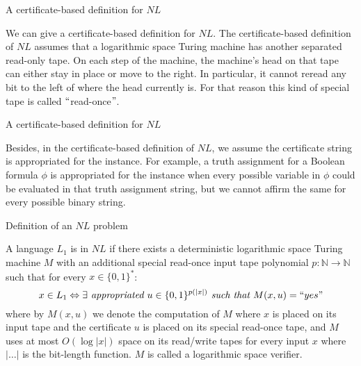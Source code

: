 \documentclass[11pt]{beamer}
\begin{document}
\begin{frame}{A certificate-based definition for $NL$}

We can give a certificate-based definition for $NL$. The certificate-based definition of $NL$ assumes that a logarithmic space Turing machine has another separated read-only tape. On each step of the machine, the machine's head on that tape can either stay in place or move to the right. In particular, it cannot reread any bit to the left of where the head currently is. For that reason this kind of special tape is called $``$read-once$"$.

\end{frame}

\begin{frame}{A certificate-based definition for $NL$}

Besides, in the certificate-based definition of $NL$, we assume the certificate string is appropriated for the instance. For example, a truth assignment for a Boolean formula $\phi$ is appropriated for the instance when every possible variable in $\phi$ could be evaluated in that truth assignment string, but we cannot affirm the same for every possible binary string.

\end{frame}

\begin{frame}{Definition of an $NL$ problem}

\begin{definition}
A language $L_{1}$ is in $NL$ if there exists a deterministic logarithmic space Turing machine $M$ with an additional special read-once input tape polynomial $p: \mathbb{N} \rightarrow \mathbb{N}$ such that for every $x \in \{0, 1\}^{*}$:
\[x \in L_{1} \Leftrightarrow \exists \textit{ appropriated } u \in \{0, 1\}^{p(|x|)} \textit{ such that } M(x, u) = ``yes" \]
where by $M(x, u)$ we denote the computation of $M$ where $x$ is placed on its input tape and the certificate $u$ is placed on its special read-once tape, and $M$ uses at most $O(\log |x|)$ space on its read/write tapes for every input $x$ where $|\ldots|$ is the bit-length function. $M$ is called a logarithmic space verifier.
\end{definition}

\end{frame}
\end{document}
